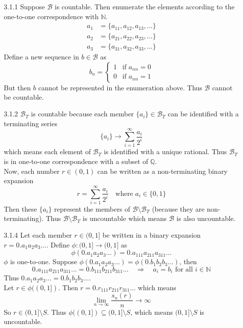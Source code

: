 \documentclass[../../Solutions.tex]{subfiles}
\begin{document}
\begin{itemize}
	\item [3.1.1] Suppose $\mathcal{B}$ is countable.
		Then enumerate the elements according to the one-to-one correspondence with $\mathbb{N}$.
		\begin{equation*} \begin{split}
			a_1 & = \{a_{11},a_{12},a_{13},\dots\} \\
			a_2 & = \{a_{21},a_{22},a_{23},\dots\} \\
			a_3 & = \{a_{31},a_{32},a_{33},\dots\}
		\end{split} \end{equation*}
		Define a new sequence in $b \in \mathcal{B}$ as
		\begin{equation*} b_n = \begin{cases}
			1 & \text{if } a_{nn} = 0 \\
			0 & \text{if } a_{nn} = 1
		\end{cases} \end{equation*}
		But then $b$ cannot be represented in the enumeration above.
		Thus $\mathcal{B}$ cannot be countable.
	
	\item  [3.1.2] $\mathcal{B}_T$ is countable because each member $\{a_i\} \in \mathcal{B}_T$ can be identified with a terminating series
		$$ \{a_i\} \to \sum_{i=1}^\infty \frac{a_i}{2^i} $$
		which means each element of $\mathcal{B}_T$ is identified with a unique rational.
		Thus $\mathcal{B}_T$ is in one-to-one correspondence with a subset of $\mathbb{Q}$. \\
		Now, each number $r \in (0,1)$ can be written as a non-terminating binary expansion
		$$ r = \sum_{i=1}^\infty \frac{a_i}{2^i} \quad\text{where } a_i \in \{0,1\} $$
		Then these $\{a_i\}$ represent the members of $\mathcal{B}\setminus\mathcal{B}_T$ (because they are non-terminating).
		Thus $\mathcal{B}\setminus\mathcal{B}_T$ is uncountable which means $\mathcal{B}$ is also uncountable.
	
	\item [3.1.4] Let each member $r \in (0,1]$ be written in a binary expansion $r = 0.a_1a_2a_3\dots$.
		Define $\phi:(0,1]\to(0,1]$ as
		$$ \phi(0.a_1a_2a_3\dots) = 0.a_111a_211a_311\dots $$
		$\phi$ is one-to-one. Suppose $\phi(0.a_1a_2a_3\dots) = \phi(0.b_1b_2b_3\dots)$, then
		$$ 0.a_111a_211a_311\dots = 0.b_111b_211b_311\dots \quad\Longrightarrow\quad a_i = b_i \text{ for all } i \in \mathbb{N} $$
		Thus $0.a_1a_2a_3\dots = 0.b_1b_2b_3\dots$. \\
		Let $r \in \phi((0,1])$. Then $r = 0.r_111r_211r_311\dots$ which means
		$$ \lim_{n\to\infty} \frac{s_n(r)}{n} \to \infty $$
		So $r \in (0,1]\setminus S$.
		Thus $\phi((0,1]) \subseteq (0,1]\setminus S$, which means $(0,1]\setminus S$ is uncountable.
	
\end{itemize}
\end{document}
